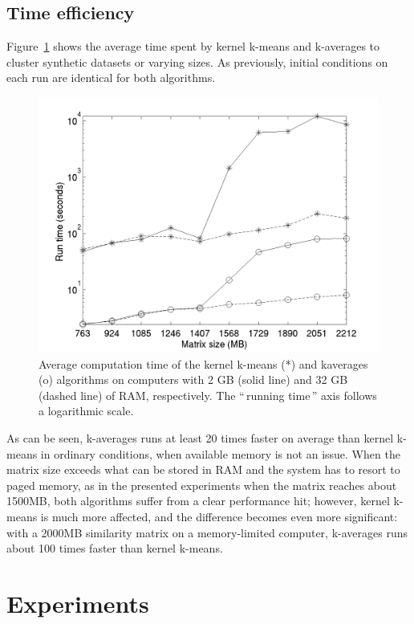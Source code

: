 \documentclass[a4paper,twoside]{article}
\newcommand{\gl}[1]{``\,#1\,''} %
\begin{document}
\subsection{Time efficiency}

Figure~\ref{fig:timing} shows the average time spent by kernel k-means and k-averages to cluster synthetic datasets or varying sizes. As previously, initial conditions on each run are identical for both algorithms.

\begin{figure}
\label{fig:timing}
\center
\includegraphics[scale=0.6]{figures/simpleSwap.png} 
\caption{Average computation time of the kernel k-means (*) and kaverages (o) algorithms on computers with 2 GB (solid line) and 32 GB (dashed line) of RAM, respectively. The \gl{running time} axis follows a logarithmic scale.}
\end{figure}

As can be seen, k-averages runs at least 20 times faster on average than kernel k-means in ordinary conditions, when  available memory is not an issue. When the matrix size exceeds what can be stored in RAM and the system has to resort to paged memory, as in the presented experiments when the matrix reaches about 1500MB, both algorithms suffer from a clear performance hit; however, kernel k-means is much more affected, and the difference becomes even more significant: with a 2000MB similarity matrix on a memory-limited computer, k-averages runs about 100 times faster than kernel k-means.


\section{Experiments}
\label{sec:experiments}
\end{document}
